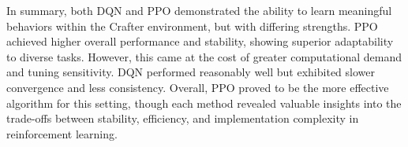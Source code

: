 \documentclass[twocolumn]{article}
\begin{document}
In summary, both DQN and PPO demonstrated the ability to learn meaningful behaviors within the Crafter environment, but with differing strengths. PPO achieved higher overall performance and stability, showing superior adaptability to diverse tasks. However, this came at the cost of greater computational demand and tuning sensitivity. DQN performed reasonably well but exhibited slower convergence and less consistency. Overall, PPO proved to be the more effective algorithm for this setting, though each method revealed valuable insights into the trade-offs between stability, efficiency, and implementation complexity in reinforcement learning.

\printbibliography
\end{document}
